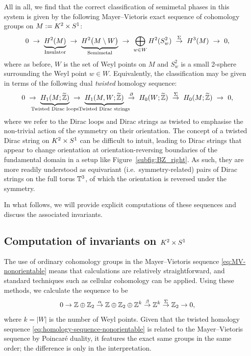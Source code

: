 All in all, we find that the correct classification of semimetal phases in this system is given by the following Mayer--Vietoris exact sequence of cohomology groups on $M := K^2\times S^1$:
\begin{equation}\label{eq:MV-nonorientable}
	0\ \to\ \underbrace{H^2(M)}_{\mathclap{\text{Insulator}}}\ \to\ \underbrace{H^2\big(M\setminus W\big)}_{\mathclap{\text{Semimetal}}}\ \to\ \bigoplus_{w\in W} H^2(S_w^2)\ \overset{\Sigma}{\to}\ H^3(M)\ \to\ 0,
\end{equation}
where as before, $W$ is the set of Weyl points on $M$ and $S_w^2$ is a small 2-sphere surrounding the Weyl point $w\in W$. Equivalently, the classification may be given in terms of the following dual \emph{twisted} homology sequence:
\begin{equation}\label{eq:homology-sequence-nonorientable}
	0\ \to\ \underbrace{H_1(M;\ext{\Z})}_{\mathclap{\text{Twisted Dirac loops}}}\ \to\ \underbrace{H_1(M, W;\ext{\Z})}_{\mathclap{\text{Twisted Dirac strings}}}\ \overset{\partial}{\to}\ H_0(W;\ext{\Z})\ \overset{\Sigma}{\to}\ H_0(M;\ext{\Z})\ \to\ 0,
\end{equation}
where we refer to the Dirac loops and Dirac strings as twisted to emphasise the non-trivial action of the symmetry on their orientation. The concept of a twisted Dirac string on $K^2\times S^1$ can be difficult to intuit, leading to Dirac strings that appear to change orientation at orientation-reversing boundaries of the fundamental domain in a setup like Figure~\ref{subfig:BZ_right}. As such, they are more readily understood as equivariant (i.e.\ symmetry-related) pairs of Dirac strings on the full torus $\mathbb{T}^3$, of which the orientation is reversed under the symmetry.

In what follows, we will provide explicit computations of these sequences and discuss the associated invariants.


\subsection{Computation of invariants on \texorpdfstring{$K^2\times S^1$}{K²×S¹}}\label{sec:invariants}

The use of ordinary cohomology groups in the Mayer--Vietoris sequence \eqref{eq:MV-nonorientable} means that calculations are relatively straightforward, and standard techniques such as cellular cohomology can be applied.  %
Using these methods, we calculate the sequence to be
\begin{equation}\label{eq:explicit-sequence-nonorientable}
	0\to \mathbb{Z}\oplus\mathbb{Z}_2 \overset{\alpha}{\to} \mathbb{Z}\oplus\mathbb{Z}_2\oplus\mathbb{Z}^k \overset{\beta}{\to} \mathbb{Z}^k \overset{\Sigma}{\to} \mathbb{Z}_2 \to 0,
\end{equation}
where $k = |W|$ is the number of Weyl points. Given that the twisted homology sequence \eqref{eq:homology-sequence-nonorientable} is related to the Mayer--Vietoris sequence by Poincaré duality, it features the exact same groups in the same order; the difference is only in the interpretation. 

